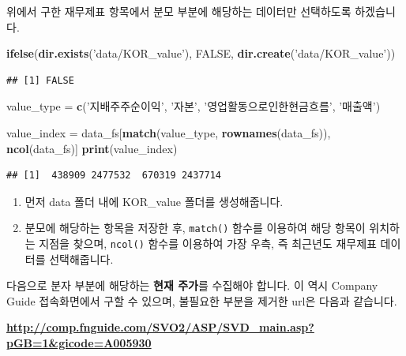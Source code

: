 \documentclass[12pt,]{book}
\newenvironment{Shaded}{\begin{snugshade}}{\end{snugshade}}
\newcommand{\KeywordTok}[1]{\textcolor[rgb]{0.13,0.29,0.53}{\textbf{#1}}}
\newcommand{\NormalTok}[1]{#1}
\newcommand{\OtherTok}[1]{\textcolor[rgb]{0.56,0.35,0.01}{#1}}
\newcommand{\StringTok}[1]{\textcolor[rgb]{0.31,0.60,0.02}{#1}}
\providecommand{\tightlist}{%
  \setlength{\itemsep}{0pt}\setlength{\parskip}{0pt}}
\begin{document}
위에서 구한 재무제표 항목에서 분모 부분에 해당하는 데이터만 선택하도록 하겠습니다.

\begin{Shaded}
\begin{Highlighting}[]
\KeywordTok{ifelse}\NormalTok{(}\KeywordTok{dir.exists}\NormalTok{(}\StringTok{'data/KOR_value'}\NormalTok{), }\OtherTok{FALSE}\NormalTok{,}
       \KeywordTok{dir.create}\NormalTok{(}\StringTok{'data/KOR_value'}\NormalTok{))}
\end{Highlighting}
\end{Shaded}

\begin{verbatim}
## [1] FALSE
\end{verbatim}

\begin{Shaded}
\begin{Highlighting}[]
\NormalTok{value_type =}\StringTok{ }\KeywordTok{c}\NormalTok{(}\StringTok{'지배주주순이익'}\NormalTok{,}
               \StringTok{'자본'}\NormalTok{,}
               \StringTok{'영업활동으로인한현금흐름'}\NormalTok{,}
               \StringTok{'매출액'}\NormalTok{)}

\NormalTok{value_index =}\StringTok{ }\NormalTok{data_fs[}\KeywordTok{match}\NormalTok{(value_type, }\KeywordTok{rownames}\NormalTok{(data_fs)),}
                      \KeywordTok{ncol}\NormalTok{(data_fs)]}
\KeywordTok{print}\NormalTok{(value_index)}
\end{Highlighting}
\end{Shaded}

\begin{verbatim}
## [1]  438909 2477532  670319 2437714
\end{verbatim}

\begin{enumerate}
\def\labelenumi{\arabic{enumi}.}
\tightlist
\item
  먼저 data 폴더 내에 KOR\_value 폴더를 생성해줍니다.
\item
  분모에 해당하는 항목을 저장한 후, \texttt{match()} 함수를 이용하여 해당 항목이 위치하는 지점을 찾으며, \texttt{ncol()} 함수를 이용하여 가장 우측, 즉 최근년도 재무제표 데이터를 선택해줍니다.
\end{enumerate}

다음으로 분자 부분에 해당하는 \textbf{현재 주가}를 수집해야 합니다. 이 역시 Company Guide 접속화면에서 구할 수 있으며, 불필요한 부분을 제거한 url은 다음과 같습니다.

\textbf{\url{http://comp.fnguide.com/SVO2/ASP/SVD_main.asp?pGB=1\&gicode=A005930}}
\end{document}
